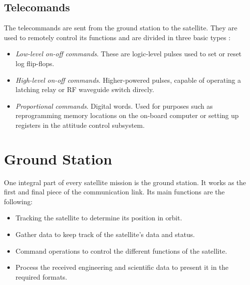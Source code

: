 \subsection{Telecomands}
The telecommands are sent from the ground station to the satellite. They are used to remotely control its functions and are divided in three basic types \cite{SSEng}:
\begin{itemize}
\item \emph{Low-level on-off commands}. These are logic-level pulses used to set or reset log flip-flops.
\item \emph{High-level on-off commands}. Higher-powered pulses, capable of operating a latching relay or RF waveguide switch direcly.
\item \emph{Proportional commands}. Digital words. Used for purposes such as reprogramming memory locations on the on-board computer or setting up registers in the attitude control subsystem.

\end{itemize}
\pagebreak

\section{Ground Station}
One integral part of every satellite mission is the ground station. It works as the first and final piece of the communication link. Its main functions are the following:
\begin{itemize}
\item Tracking the satellite to determine its position in orbit.
\item Gather data to keep track of the satellite's data and status.
\item Command operations to control the different functions of the satellite.
\item Process the received engineering and scientific data to present it in the required formats.
\end{itemize}


